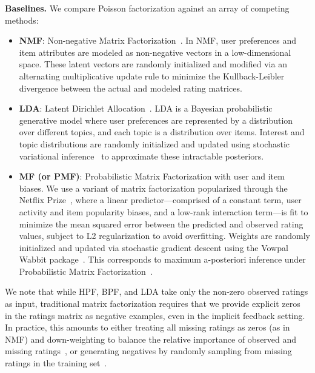 {\bf Baselines.} We compare Poisson factorization against an array of
competing methods:
\begin{itemize}
  \item {\bf NMF}: Non-negative Matrix
    Factorization~\cite{Lee:1999}. In NMF, user preferences and item
    attributes are modeled as non-negative vectors in a
    low-dimensional space. These latent vectors are randomly
    initialized and modified via an alternating multiplicative update
    rule to minimize the Kullback-Leibler divergence between the
    actual and modeled rating matrices.

  \item {\bf LDA}: Latent Dirichlet Allocation~\cite{Blei:2003b}. LDA
    is a Bayesian probabilistic generative model where user preferences
    are represented by a distribution over different topics, and each
    topic is a distribution over items. Interest and topic
    distributions are randomly initialized and updated using
    stochastic variational inference~\cite{Hoffman:2010a} to
    approximate these intractable posteriors.

  \item {\bf MF (or PMF)}: Probabilistic Matrix Factorization with
    user and item biases. We use a variant of matrix factorization
    popularized through the Netflix Prize~\cite{Koren:2009}, where a
    linear predictor---comprised of a constant term, user activity and
    item popularity biases, and a low-rank interaction term---is fit
    to minimize the mean squared error between the predicted and
    observed rating values, subject to L2 regularization to avoid
    overfitting. Weights are randomly initialized and updated via
    stochastic gradient descent using the Vowpal Wabbit
    package~\cite{Weinberger:2009}. This corresponds to maximum
    a-posteriori inference under Probabilistic Matrix
    Factorization~\cite{Salakhutdinov:2008a}.
\end{itemize}

We note that while HPF, BPF, and LDA take only the non-zero observed
ratings as input, traditional matrix factorization requires that we
provide explicit zeros in the ratings matrix as negative examples,
even in the implicit feedback setting. In practice, this amounts to
either treating all missing ratings as zeros (as in NMF) and
down-weighting to balance the relative importance of observed and
missing ratings~\cite{Hu:2008p9402}, or generating negatives by
randomly sampling from missing ratings in the training
set~\cite{Dror:2012a}.

